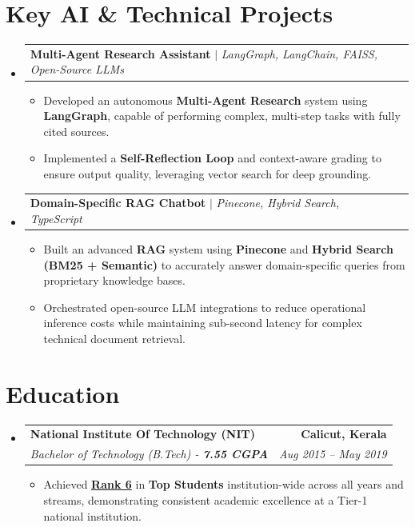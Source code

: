 \documentclass[letterpaper,12pt]{article}
\makeatletter
\newcommand{\resumeItem}[1]{
  \item\small{
    {#1}
  }
}
\newcommand{\resumeSubheading}[4]{
  \vspace{4pt}\item
    \begin{tabular*}{1.0\textwidth}[t]{l@{\extracolsep{\fill}}r}
      \textbf{#1} & \textbf{\small #2} \\
      \textit{\small#3} & \textit{\small #4} \\
    \end{tabular*}\vspace{2pt}
}
\newcommand{\resumeProjectHeading}[2]{
    \item
    \begin{tabular*}{1.0\textwidth}{l@{\extracolsep{\fill}}r}
      \small#1 & \textbf{\small #2}\\
    \end{tabular*}\vspace{-2pt}
}
\newcommand{\resumeSubHeadingListStart}{\begin{itemize}[leftmargin=0.0in, label={}]}
\newcommand{\resumeSubHeadingListEnd}{\end{itemize}}
\newcommand{\resumeItemListStart}{\begin{itemize}}
\newcommand{\resumeItemListEnd}{\end{itemize}\vspace{-2pt}}
\makeatother
\begin{document}
\section{Key AI \& Technical Projects}
\vspace{-2pt}
    \resumeSubHeadingListStart
      \resumeProjectHeading
          {\textbf{Multi-Agent Research Assistant} $|$ \emph{LangGraph, LangChain, FAISS, Open-Source LLMs}}{}
          \resumeItemListStart
            \resumeItem{Developed an autonomous \textbf{Multi-Agent Research} system using \textbf{LangGraph}, capable of performing complex, multi-step tasks with fully cited sources.}
            \resumeItem{Implemented a \textbf{Self-Reflection Loop} and context-aware grading to ensure output quality, leveraging vector search for deep grounding.}
          \resumeItemListEnd
          \vspace{4pt}

      \resumeProjectHeading
          {\textbf{Domain-Specific RAG Chatbot} $|$ \emph{Pinecone, Hybrid Search, TypeScript}}{}
          \resumeItemListStart
            \resumeItem{Built an advanced \textbf{RAG} system using \textbf{Pinecone} and \textbf{Hybrid Search (BM25 + Semantic)} to accurately answer domain-specific queries from proprietary knowledge bases.}
            \resumeItem{Orchestrated open-source LLM integrations to reduce operational inference costs while maintaining sub-second latency for complex technical document retrieval.}
          \resumeItemListEnd 
    \resumeSubHeadingListEnd
\vspace{-6pt}

\section{Education}
\vspace{-2pt}
  \resumeSubHeadingListStart
    \resumeSubheading
      {National Institute Of Technology (NIT)}{Calicut, Kerala}
      {Bachelor of Technology (B.Tech) - \textbf{7.55 CGPA}}{Aug 2015 -- May 2019}
      \resumeItemListStart
        \resumeItem{Achieved \textbf{\href{https://www.university.youth4work.com/nit_calicut_national-institute-of-technology-calicut/report/5}{Rank 6}} in \textbf{Top Students} institution-wide across all years and streams, demonstrating consistent academic excellence at a Tier-1 national institution.}
        
      \resumeItemListEnd
  \resumeSubHeadingListEnd
\vspace{-6pt}
\end{document}
